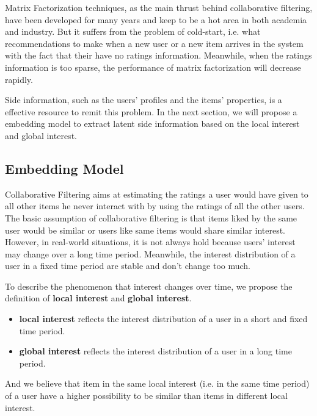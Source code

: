 \documentclass{sig-alternate-05-2015}
\begin{document}
Matrix Factorization techniques, as the main thrust behind collaborative filtering,
have been developed for many years and keep to be a hot area in both academia and industry.
But it suffers from the problem of cold-start,
i.e. what recommendations to make when a new user or a new item arrives in the system
with the fact that their have no ratings information.
Meanwhile, when the ratings information is too sparse,
the performance of matrix factorization will decrease rapidly.

Side information, such as the users' profiles and the items' properties,
is a effective resource to remit this problem.
In the next section, we will propose a embedding model
to extract latent side information based on the local interest and global interest.

\subsection{Embedding Model}
Collaborative Filtering aims at estimating the ratings
a user would have given to all other items he never interact with
by using the ratings of all the other users.
The basic assumption of collaborative filtering is that
items liked by the same user would be similar
or users like same items would share similar interest.
However, in real-world situations,
it is not always hold because users' interest may change over
a long time period.
Meanwhile, the interest distribution of a user in a fixed time period
are stable and don't change too much.

To describe the phenomenon that interest changes over time,
we propose the definition of \textbf{local interest} and \textbf{global interest}.

\begin{itemize}
\item \textbf{local interest} reflects the interest distribution of a user
in a short and fixed time period.
\item \textbf{global interest} reflects the interest distribution of a user
in a long time period.
\end{itemize}

And we believe that item in the same local interest (i.e. in the same time period)
of a user have a higher possibility to be similar than
items in different local interest.
\end{document}

